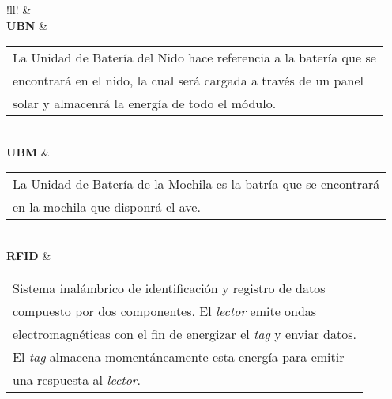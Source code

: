 \begin{table}[H]
\centering
\begin{tabular}{!{\color{AzulTable}\vrule}ll!{\color{AzulTable}\vrule}}
\hline
{}
 &  \\ \hline
\textbf{UBN}		& \begin{tabular}[l]{@{}l@{}}La Unidad de Batería del Nido hace referencia a la batería que se\\ encontrará en el nido, la cual será cargada a través de un panel\\ solar y almacenrá la energía de todo el módulo.\end{tabular}							\\ \hline
\textbf{UBM}		& \begin{tabular}[l]{@{}l@{}}La Unidad de Batería de la Mochila es la batría que se encontrará\\ en la mochila que disponrá el ave.\end{tabular}						\\ \hline
\textbf{RFID}		& \begin{tabular}[l]{@{}l@{}}Sistema inalámbrico de identificación y registro de datos\\ compuesto por dos componentes. El \textit{lector} emite ondas\\ electromagnéticas con el fin de energizar el \textit{tag} y enviar datos.\\ El \textit{tag} almacena momentáneamente esta energía para emitir\\ una respuesta al \textit{lector}. \end{tabular}						\\ \hline
\end{tabular}
\end{table}

